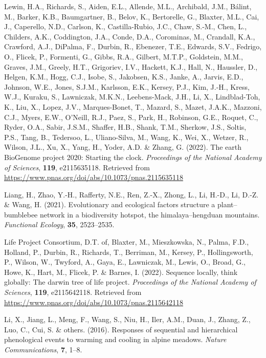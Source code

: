 \documentclass[
]{article}
\newlength{\cslhangindent}
\newlength{\cslentryspacingunit} %
\newenvironment{CSLReferences}[2] %
 {%
  \setlength{\parindent}{0pt}
  \ifodd #1
  \let\oldpar\par
  \def\par{\hangindent=\cslhangindent\oldpar}
  \fi
  \setlength{\parskip}{#2\cslentryspacingunit}
 }%
 {}
\begin{document}
\begin{CSLReferences}{1}{0}
\leavevmode{}%
Lewin, H.A., Richards, S., Aiden, E.L., Allende, M.L., Archibald, J.M.,
Bálint, M., Barker, K.B., Baumgartner, B., Belov, K., Bertorelle, G.,
Blaxter, M.L., Cai, J., Caperello, N.D., Carlson, K., Castilla-Rubio,
J.C., Chaw, S.-M., Chen, L., Childers, A.K., Coddington, J.A., Conde,
D.A., Corominas, M., Crandall, K.A., Crawford, A.J., DiPalma, F.,
Durbin, R., Ebenezer, T.E., Edwards, S.V., Fedrigo, O., Flicek, P.,
Formenti, G., Gibbs, R.A., Gilbert, M.T.P., Goldstein, M.M., Graves,
J.M., Greely, H.T., Grigoriev, I.V., Hackett, K.J., Hall, N., Haussler,
D., Helgen, K.M., Hogg, C.J., Isobe, S., Jakobsen, K.S., Janke, A.,
Jarvis, E.D., Johnson, W.E., Jones, S.J.M., Karlsson, E.K., Kersey,
P.J., Kim, J.-H., Kress, W.J., Kuraku, S., Lawniczak, M.K.N.,
Leebens-Mack, J.H., Li, X., Lindblad-Toh, K., Liu, X., Lopez, J.V.,
Marques-Bonet, T., Mazard, S., Mazet, J.A.K., Mazzoni, C.J., Myers,
E.W., O'Neill, R.J., Paez, S., Park, H., Robinson, G.E., Roquet, C.,
Ryder, O.A., Sabir, J.S.M., Shaffer, H.B., Shank, T.M., Sherkow, J.S.,
Soltis, P.S., Tang, B., Tedersoo, L., Uliano-Silva, M., Wang, K., Wei,
X., Wetzer, R., Wilson, J.L., Xu, X., Yang, H., Yoder, A.D. \& Zhang, G.
(2022). The earth BioGenome project 2020: Starting the clock.
\emph{Proceedings of the National Academy of Sciences}, \textbf{119},
e2115635118. Retrieved from
\url{https://www.pnas.org/doi/abs/10.1073/pnas.2115635118}

\leavevmode{}%
Liang, H., Zhao, Y.-H., Rafferty, N.E., Ren, Z.-X., Zhong, L., Li,
H.-D., Li, D.-Z. \& Wang, H. (2021). Evolutionary and ecological factors
structure a plant--bumblebee network in a biodiversity hotspot, the
himalaya--hengduan mountains. \emph{Functional Ecology}, \textbf{35},
2523--2535.

\leavevmode{}%
Life Project Consortium, D.T. of, Blaxter, M., Mieszkowska, N., Palma,
F.D., Holland, P., Durbin, R., Richards, T., Berriman, M., Kersey, P.,
Hollingsworth, P., Wilson, W., Twyford, A., Gaya, E., Lawniczak, M.,
Lewis, O., Broad, G., Howe, K., Hart, M., Flicek, P. \& Barnes, I.
(2022). Sequence locally, think globally: The darwin tree of life
project. \emph{Proceedings of the National Academy of Sciences},
\textbf{119}, e2115642118. Retrieved from
\url{https://www.pnas.org/doi/abs/10.1073/pnas.2115642118}

\leavevmode{}%
Li, X., Jiang, L., Meng, F., Wang, S., Niu, H., Iler, A.M., Duan, J.,
Zhang, Z., Luo, C., Cui, S. \& others. (2016). Responses of sequential
and hierarchical phenological events to warming and cooling in alpine
meadows. \emph{Nature Communications}, \textbf{7}, 1--8.


\end{CSLReferences}
\end{document}
